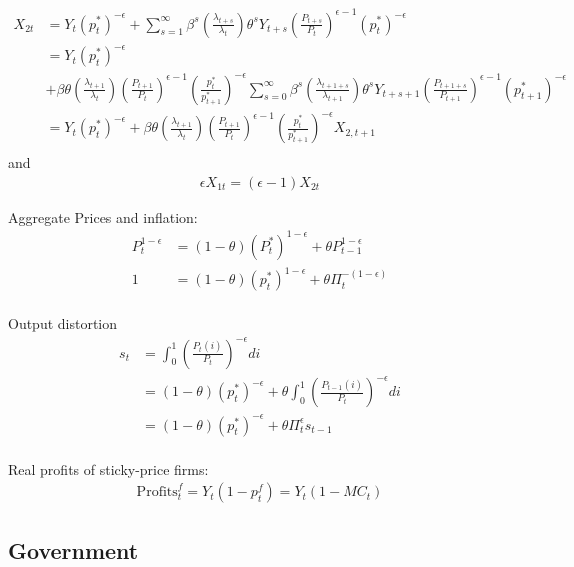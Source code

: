 \documentclass[11pt]{article}
\begin{document}
\begin{align*}
	X_{2t} & =  Y_t  (p_t^*)^{-\epsilon} + \sum_{s=1}^{\infty} \beta^s\left(\frac{\lambda_{t+s}}{\lambda_t}\right)\theta^{s}Y_{t+s}\left(\frac{P_{t+s}}{P_t}\right)^{\epsilon-1}  (p_t^*)^{-\epsilon}  \\ 
	& =  Y_{t} (p_t^*)^{-\epsilon} \\
	& + \beta\theta \left(\frac{\lambda_{t+1}}{\lambda_t}\right)  \left(\frac{P_{t+1}}{P_{t}}\right)^{\epsilon-1} \left(\frac{p_t^*}{p_{t+1}^*}\right)^{-\epsilon}  \sum_{s=0}^{\infty} \beta^s\left(\frac{\lambda_{t+1+s}}{\lambda_{t+1}}\right)\theta^{s} Y_{t+s+1} \left(\frac{P_{t+1+s}}{P_{t+1}}\right)^{\epsilon-1} (p_{t+1}^*)^{-\epsilon} \\ 
	& =  Y_{t} (p_t^*)^{-\epsilon} + \beta\theta  \left(\frac{\lambda_{t+1}}{\lambda_{t}}\right)\left(\frac{P_{t+1}}{P_{t}}\right)^{\epsilon-1} \left(\frac{p_t^*}{p_{t+1}^*}\right)^{-\epsilon}  X_{2,t+1} \\ 
\end{align*}
and
\begin{align*}
	\epsilon  X_{1t}=(\epsilon-1)X_{2t}
\end{align*}


Aggregate Prices and inflation:
\begin{align*}
	P_t^{1-\epsilon} &= (1-\theta)(P_{t}^*)^{1-\epsilon} + \theta P_{t-1}^{1-\epsilon} \\
	1 &= (1-\theta)(p_{t}^*)^{1-\epsilon} + \theta \Pi_{t}^{-(1-\epsilon)} \\
\end{align*}

Output distortion
\begin{align*}
	s_t &= \int_0^1 \left(\frac{P_{t}(i)}{P_t}\right)^{-\epsilon}di \\
	&= (1-\theta)(p_t^*)^{-\epsilon} + \theta \int_0^1   \left(\frac{P_{t-1}(i)}{P_t}\right)^{-\epsilon}di \\
	&=(1-\theta)(p_t^*)^{-\epsilon} + \theta \Pi_t^{\epsilon} s_{t-1} \\
\end{align*}

Real profits of sticky-price firms:
\begin{align*}
	\text{Profits}_t^f = Y_t(1-p_t^f) = Y_t(1-MC_t)
\end{align*}


\subsection{Government}
\end{document}
